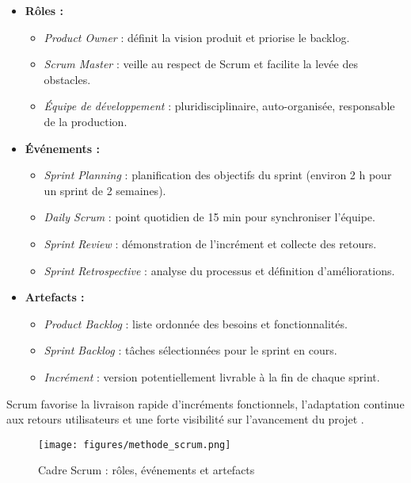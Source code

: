 \documentclass[12pt,a4paper]{report}
\begin{document}
\begin{itemize}
  \item \textbf{Rôles :}
    \begin{itemize}
      \item \textit{Product Owner} : définit la vision produit et priorise le backlog.
      \item \textit{Scrum Master} : veille au respect de Scrum et facilite la levée des obstacles.
      \item \textit{Équipe de développement} : pluridisciplinaire, auto-organisée, responsable de la production.
    \end{itemize}
  \item \textbf{Événements :}
    \begin{itemize}
      \item \textit{Sprint Planning} : planification des objectifs du sprint (environ 2 h pour un sprint de 2 semaines).
      \item \textit{Daily Scrum} : point quotidien de 15 min pour synchroniser l’équipe.
      \item \textit{Sprint Review} : démonstration de l’incrément et collecte des retours.
      \item \textit{Sprint Retrospective} : analyse du processus et définition d’améliorations.
    \end{itemize}
  \item \textbf{Artefacts :}
    \begin{itemize}
      \item \textit{Product Backlog} : liste ordonnée des besoins et fonctionnalités.
      \item \textit{Sprint Backlog} : tâches sélectionnées pour le sprint en cours.
      \item \textit{Incrément} : version potentiellement livrable à la fin de chaque sprint.
    \end{itemize}
\end{itemize}

Scrum favorise la livraison rapide d’incréments fonctionnels, l’adaptation continue aux retours utilisateurs et une forte visibilité sur l’avancement du projet \cite{SchwaberBeedle2001}.  
\begin{figure}[H]
  \centering
  \texttt{[image: figures/methode\_scrum.png]}
  \caption{Cadre Scrum : rôles, événements et artefacts}
  \label{fig:scrum_framework}
\end{figure}
\end{document}
